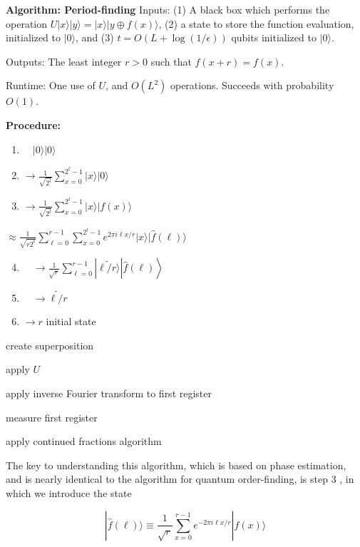 \textbf{Algorithm: Period-finding}
Inputs: (1) A black box which performs the operation $U|x\rangle|y\rangle=|x\rangle|y \oplus f(x)\rangle$, (2) a state to store the function evaluation, initialized to $|0\rangle$, and (3) $t=O(L+\log (1 / \epsilon))$ qubits initialized to $|0\rangle$.

Outputs: The least integer $r>0$ such that $f(x+r)=f(x)$.

Runtime: One use of $U$, and $O\left(L^{2}\right)$ operations. Succeeds with probability $O(1)$.

\textbf{Procedure:}
\begin{enumerate}
    \item $\quad|0\rangle|0\rangle$
    \item $\rightarrow \frac{1}{\sqrt{2^{t}}} \sum_{x=0}^{2^{t}-1}|x\rangle|0\rangle$
    \item $\rightarrow \frac{1}{\sqrt{2^{t}}} \sum_{x=0}^{2^{t}-1}|x\rangle|f(x)\rangle$

\end{enumerate}

$\approx \frac{1}{\sqrt{r 2^{t}}} \sum_{\ell=0}^{r-1} \sum_{x=0}^{2^{t}-1} e^{2 \pi i \ell x / r}|x\rangle|\hat{f}(\ell)\rangle$

\begin{enumerate}
  \setcounter{enumi}{3}
    \item $\left.\quad \rightarrow \frac{1}{\sqrt{r}} \sum_{\ell=0}^{r-1}|\widetilde{\ell / r\rangle}| \hat{f}(\ell)\right\rangle$
    \item $\quad \rightarrow \widetilde{\ell / r}$
    \item $\rightarrow r$ initial state

\end{enumerate}

create superposition

apply $U$

apply inverse Fourier transform to first register

measure first register

apply continued fractions algorithm

The key to understanding this algorithm, which is based on phase estimation, and is nearly identical to the algorithm for quantum order-finding, is step 3 , in which we introduce the state

\begin{equation}
    |\hat{f}(\ell)\rangle \equiv \frac{1}{\sqrt{r}} \sum_{x=0}^{r-1} e^{-2 \pi i \ell x / r}|f(x)\rangle \tag{5.63}
\end{equation}


